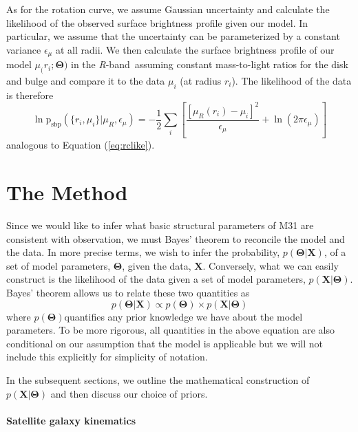 \documentclass[preprint,12pt]{aastex}
\newcommand{\eqlabel}[1]{\label{eq:#1}}
\newcommand{\eq}[1]{Equation (\ref{eq:#1})}
\newcommand{\bvec}[1]{\ensuremath{\boldsymbol{#1}}}
\renewcommand{\vector}[1]{\ensuremath{\bvec{#1}}}
\newcommand{\model}{\vector{\Theta}}
\newcommand{\data}{\vector{X}}
\newcommand{\prob}{\ensuremath{p}}
\newcommand{\probability}[2]{\ensuremath{\prob ( #1 | #2 )}}
\newcommand{\likelihood}{\probability{\data}{\model}}
\newcommand{\posterior}{\probability{\model}{\data}}
\newcommand{\prior}{\ensuremath{\prob (\model)}}
\newcommand{\sbp}[1]{\ensuremath{\mu_\mathrm{#1}}}
\newcommand{\sbpmodel}{\sbp}
\newcommand{\Kband}{\emph{R}-band}
\begin{document}
As for the rotation curve, we assume Gaussian uncertainty and calculate the
likelihood of the observed surface brightness profile given our model.  In
particular, we assume that the uncertainty can be parameterized by a
constant variance $\epsilon_\mu$ at all radii.  We then calculate the
surface brightness
profile of our model $\sbpmodel (r_i; \model)$ in the \Kband\ assuming
constant mass-to-light ratios for the disk and bulge and compare it to the
data $\mu_i$ (at radius $r_i$).  The likelihood of the data is therefore
\begin{equation}
    \eqlabel{sbpprob}
    \ln \mathrm{p}_\mathrm{sbp} (\{ r_i, \mu_i \} | \mu_R,\epsilon_\mu )
    = - \frac{1}{2} \sum_i \left [ \frac{\left [ \mu_R (r_i) - \mu_i \right ]^2 }
        {\epsilon_\mu} + \ln (2 \pi \epsilon_\mu) \right ]
\end{equation}
analogous to \eq{rclike}.



\section{The Method}

Since we would like to infer what basic structural parameters of M31 are consistent
with observation, we must Bayes' theorem to reconcile the model and the data.
In more precise terms, we wish to infer the probability, \posterior, of a set
of model parameters, \model, given the data, \data.  Conversely, what we can
easily construct is the likelihood of the data given a set of model parameters,
\likelihood.  Bayes' theorem allows us to relate these two quantities as
\begin{equation}
    \posterior \propto \prior \times \likelihood
\end{equation}
where \prior quantifies any prior knowledge we have about the model parameters.
To be more rigorous, all quantities in the above equation are also conditional
on our assumption that the model is applicable but we will not include this
explicitly for simplicity of notation.

In the subsequent sections, we outline the mathematical construction of \likelihood
and then discuss our choice of priors.

\paragraph{Satellite galaxy kinematics}
\end{document}

